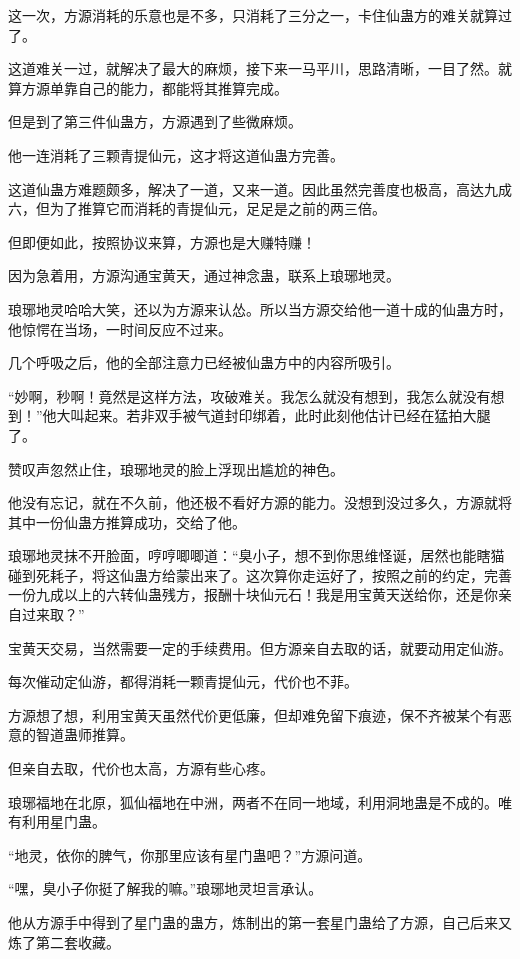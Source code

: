 \begin{this_body}
这一次，方源消耗的乐意也是不多，只消耗了三分之一，卡住仙蛊方的难关就算过了。

这道难关一过，就解决了最大的麻烦，接下来一马平川，思路清晰，一目了然。就算方源单靠自己的能力，都能将其推算完成。

但是到了第三件仙蛊方，方源遇到了些微麻烦。

他一连消耗了三颗青提仙元，这才将这道仙蛊方完善。

这道仙蛊方难题颇多，解决了一道，又来一道。因此虽然完善度也极高，高达九成六，但为了推算它而消耗的青提仙元，足足是之前的两三倍。

但即便如此，按照协议来算，方源也是大赚特赚！

因为急着用，方源沟通宝黄天，通过神念蛊，联系上琅琊地灵。

琅琊地灵哈哈大笑，还以为方源来认怂。所以当方源交给他一道十成的仙蛊方时，他惊愕在当场，一时间反应不过来。

几个呼吸之后，他的全部注意力已经被仙蛊方中的内容所吸引。

“妙啊，秒啊！竟然是这样方法，攻破难关。我怎么就没有想到，我怎么就没有想到！”他大叫起来。若非双手被气道封印绑着，此时此刻他估计已经在猛拍大腿了。

赞叹声忽然止住，琅琊地灵的脸上浮现出尴尬的神色。

他没有忘记，就在不久前，他还极不看好方源的能力。没想到没过多久，方源就将其中一份仙蛊方推算成功，交给了他。

琅琊地灵抹不开脸面，哼哼唧唧道：“臭小子，想不到你思维怪诞，居然也能瞎猫碰到死耗子，将这仙蛊方给蒙出来了。这次算你走运好了，按照之前的约定，完善一份九成以上的六转仙蛊残方，报酬十块仙元石！我是用宝黄天送给你，还是你亲自过来取？”

宝黄天交易，当然需要一定的手续费用。但方源亲自去取的话，就要动用定仙游。

每次催动定仙游，都得消耗一颗青提仙元，代价也不菲。

方源想了想，利用宝黄天虽然代价更低廉，但却难免留下痕迹，保不齐被某个有恶意的智道蛊师推算。

但亲自去取，代价也太高，方源有些心疼。

琅琊福地在北原，狐仙福地在中洲，两者不在同一地域，利用洞地蛊是不成的。唯有利用星门蛊。

“地灵，依你的脾气，你那里应该有星门蛊吧？”方源问道。

“嘿，臭小子你挺了解我的嘛。”琅琊地灵坦言承认。

他从方源手中得到了星门蛊的蛊方，炼制出的第一套星门蛊给了方源，自己后来又炼了第二套收藏。


\end{this_body}
